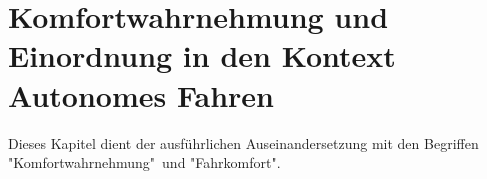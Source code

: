 \chapter{Komfortwahrnehmung und Einordnung in den Kontext Autonomes Fahren}
Dieses Kapitel dient der ausführlichen Auseinandersetzung mit den Begriffen "Komfortwahrnehmung"\, und "Fahrkomfort". 